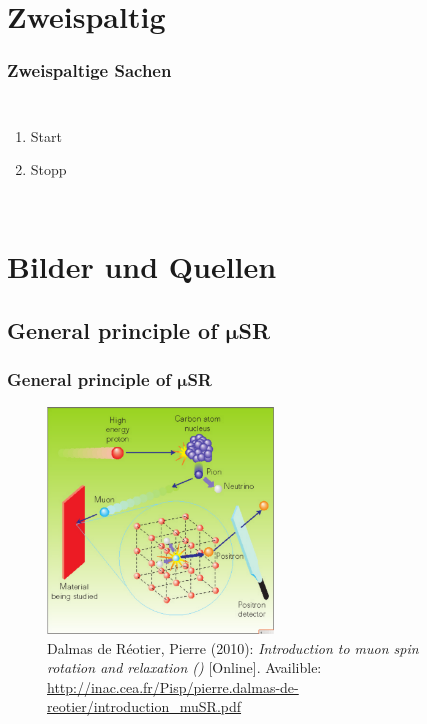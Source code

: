 \section{Zweispaltig}
\begin{frame}
	\frametitle{Zweispaltige Sachen}
    \begin{columns}
                 \begin{enumerate}
                 \item Start
                 \item Stopp
                 \end{enumerate}
    \end{columns}
\end{frame}










\section{Bilder und Quellen}
\subsection{General principle of $\mathbf{\mu}$SR}
\begin{frame}[fragile]
	\frametitle{General principle of $\mathbf{\mu}$SR}
	\begin{figure}[!htb]
		\begin{center}
			\includegraphics[height=6cm, keepaspectratio]{Bilder/musr_general_principle.png}%
			\caption*{  \setlength{\baselineskip}{6pt}
				{\tiny Dalmas de Réotier, Pierre (2010): \textit{Introduction to muon spin rotation and relaxation (\musr)} [Online]. Availible: \url{http://inac.cea.fr/Pisp/pierre.dalmas-de-				reotier/introduction_muSR.pdf}}
			}%
		\end{center}
	\end{figure}          
\end{frame}













